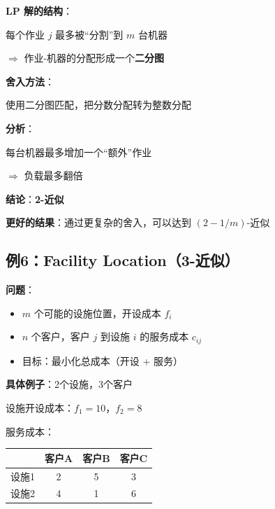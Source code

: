 \documentclass[12pt, a4paper]{ctexart}
\begin{document}
\begin{blackboard}

\textbf{LP 解的结构}：

每个作业 $j$ 最多被``分割''到 $m$ 台机器

$\Rightarrow$ 作业-机器的分配形成一个\textbf{二分图}

\textbf{舍入方法}：

使用二分图匹配，把分数分配转为整数分配

\textbf{分析}：

每台机器最多增加一个``额外''作业

$\Rightarrow$ 负载最多翻倍

\textbf{结论}：\textbf{2-近似}

\textbf{更好的结果}：通过更复杂的舍入，可以达到 $(2 - 1/m)$-近似

\end{blackboard}

\subsection{例6：Facility Location（3-近似）}

\begin{blackboard}[设施选址问题]

\textbf{问题}：
\begin{itemize}
    \item $m$ 个可能的设施位置，开设成本 $f_i$
    \item $n$ 个客户，客户 $j$ 到设施 $i$ 的服务成本 $c_{ij}$
    \item 目标：最小化总成本（开设 + 服务）
\end{itemize}

\textbf{具体例子}：2个设施，3个客户

设施开设成本：$f_1 = 10$，$f_2 = 8$

服务成本：
\begin{center}
\begin{tabular}{c|c|c|c}
& 客户A & 客户B & 客户C \\
\hline
设施1 & 2 & 5 & 3 \\
设施2 & 4 & 1 & 6
\end{tabular}
\end{center}

\end{blackboard}
\end{document}
